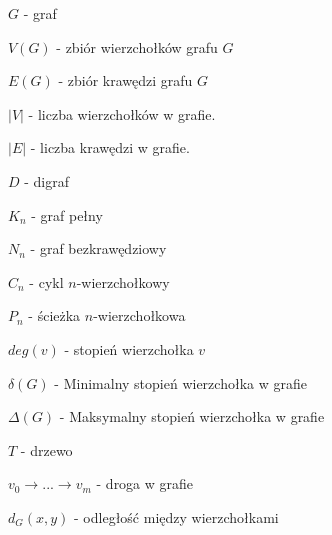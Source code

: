 $G$ - graf

$V(G)$ - zbiór wierzchołków grafu $G$

$E(G)$ - zbiór krawędzi grafu $G$

$|V|$ - liczba wierzchołków w grafie.

$|E|$ - liczba krawędzi w grafie.

$D$ - digraf

$K_n$ - graf pełny

$N_n$ - graf bezkrawędziowy

$C_n$ - cykl $n$-wierzchołkowy

$P_n$ - ścieżka $n$-wierzchołkowa

$deg(v)$ - stopień wierzchołka $v$

$\delta(G)$ - Minimalny stopień wierzchołka w grafie
 
$\Delta(G)$ - Maksymalny stopień wierzchołka w grafie

$T$ - drzewo

$v_0 \rightarrow ... \rightarrow v_m$ - droga w grafie

$d_G(x,y)$ - odległość między wierzchołkami

